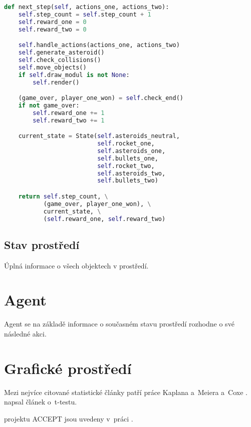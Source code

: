 \newpage
\begin{lstlisting}[language=Python]
def next_step(self, actions_one, actions_two):
    self.step_count = self.step_count + 1
    self.reward_one = 0
    self.reward_two = 0

    self.handle_actions(actions_one, actions_two)
    self.generate_asteroid()
    self.check_collisions()
    self.move_objects()
    if self.draw_modul is not None:
        self.render()

    (game_over, player_one_won) = self.check_end()
    if not game_over:
        self.reward_one += 1
        self.reward_two += 1

    current_state = State(self.asteroids_neutral, 
                          self.rocket_one, 
                          self.asteroids_one, 
                          self.bullets_one,
                          self.rocket_two, 
                          self.asteroids_two, 
                          self.bullets_two)

    return self.step_count, \
           (game_over, player_one_won), \
           current_state, \
           (self.reward_one, self.reward_two)
\end{lstlisting}
\newpage



\subsection{Stav prostředí}
Úplná informace o všech objektech v prostředí.

\section{Agent}
Agent se na základě informace o současném stavu prostředí rozhodne o své následné akci. 


\section{Grafické prostředí}

Mezi nejvíce citované statistické články patří práce Kaplana a~Meiera a~Coxe
\citep{KaplanMeier58, Cox72}. \citet{Student08} napsal článek o~t-testu.

projektu ACCEPT jsou uvedeny v~práci \citet*{Genberget08}.
